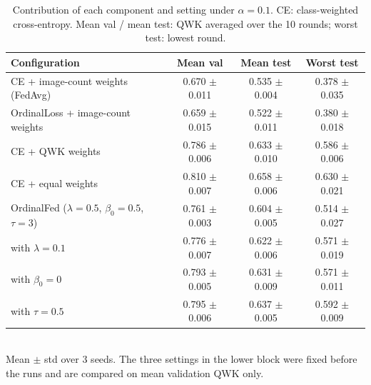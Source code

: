 \begin{table}[!t]
\centering
\caption{Contribution of each component and setting under $\alpha=0.1$. CE: class-weighted cross-entropy. Mean val / mean test: QWK averaged over the 10 rounds; worst test: lowest round.}
\label{tab:ablation}
\begin{tabular}{lccc}
\toprule
Configuration & Mean val & Mean test & Worst test \\
\midrule
CE + image-count weights (FedAvg) & 0.670 $\pm$ 0.011 & 0.535 $\pm$ 0.004 & 0.378 $\pm$ 0.035 \\
OrdinalLoss + image-count weights & 0.659 $\pm$ 0.015 & 0.522 $\pm$ 0.011 & 0.380 $\pm$ 0.018 \\
CE + QWK weights & 0.786 $\pm$ 0.006 & 0.633 $\pm$ 0.010 & 0.586 $\pm$ 0.006 \\
CE + equal weights & 0.810 $\pm$ 0.007 & 0.658 $\pm$ 0.006 & 0.630 $\pm$ 0.021 \\
\midrule
OrdinalFed ($\lambda=0.5$, $\beta_0=0.5$, $\tau=3$) & 0.761 $\pm$ 0.003 & 0.604 $\pm$ 0.005 & 0.514 $\pm$ 0.027 \\
\quad with $\lambda=0.1$ & 0.776 $\pm$ 0.007 & 0.622 $\pm$ 0.006 & 0.571 $\pm$ 0.019 \\
\quad with $\beta_0=0$ & 0.793 $\pm$ 0.005 & 0.631 $\pm$ 0.009 & 0.571 $\pm$ 0.011 \\
\quad with $\tau=0.5$ & 0.795 $\pm$ 0.006 & 0.637 $\pm$ 0.005 & 0.592 $\pm$ 0.009 \\
\bottomrule
\end{tabular}
\\[2pt]{\footnotesize Mean $\pm$ std over 3 seeds. The three settings in the lower block were fixed before the runs and are compared on mean validation QWK only.}
\end{table}
